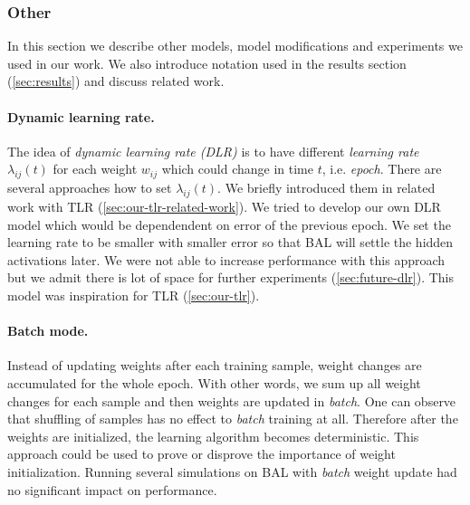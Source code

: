 \subsubsection{Other}

In this section we describe other models, model modifications and experiments we used in our work. We also introduce notation used in the results section (\ref{sec:results}) and discuss related work. 

\paragraph{Dynamic learning rate.} 
\label{sec:our-dynamic-lambda} 
The idea of \emph{dynamic learning rate (DLR)} \citep{jacobs1988increased} is to have different \emph{learning rate} $\lambda_{ij}(t)$ for each weight $w_{ij}$ which could change in time $t$, i.e. \emph{epoch}. There are several approaches how to set $\lambda_{ij}(t)$. We briefly introduced them in related work with TLR (\ref{sec:our-tlr-related-work}). We tried to develop our own DLR model which would be dependendent on error of the previous epoch. We set the learning rate to be smaller with smaller error so that BAL will settle the hidden activations later. We were not able to increase performance with this approach but we admit there is lot of space for further experiments (\ref{sec:future-dlr}). This model was inspiration for TLR (\ref{sec:our-tlr}). 




\paragraph{Batch mode.} Instead of updating weights after each training sample, weight changes are accumulated for the whole epoch. With other words, we sum up all weight changes for each sample and then weights are updated in \emph{batch}. One can observe that shuffling of samples has no effect to \emph{batch} training at all. Therefore after the weights are initialized, the learning algorithm becomes deterministic. This approach could be used to prove or disprove the importance of weight initialization. Running several simulations on BAL with \emph{batch} weight update had no significant impact on performance. 

